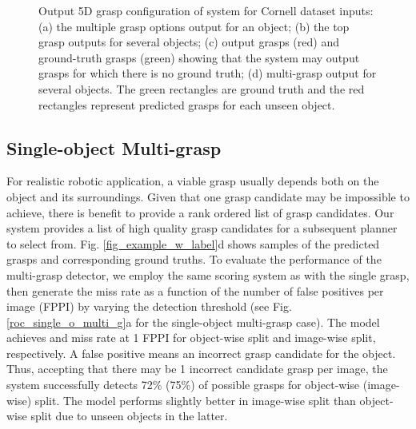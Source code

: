 \documentclass[letterpaper, 10 pt, journal, twoside]{IEEEtran}
\begin{document}
\begin{figure*}[t]
  \centering
  \vspace*{0.07in}
  \caption{Output 5D grasp configuration of system for Cornell dataset inputs: 
    (a) the multiple grasp options output for an object; 
    (b) the top grasp outputs for several objects; 
    (c) output grasps (red) and ground-truth grasps
    (green) showing that the system may output grasps for which
    there is no ground truth;
(d) multi-grasp output for several objects. The green rectangles are
    ground truth and the red rectangles represent predicted grasps for 
    each unseen object.
\label{fig_newArea} \label{fig_example_w_label} \label{singleGrasp}}
  \vspace*{-0.125in}
\end{figure*}

\subsection{Single-object Multi-grasp}
For realistic robotic application, a viable grasp usually depends both
on the object and its surroundings.  Given that one grasp candidate may
be impossible to achieve, there is benefit to provide a rank ordered
list of grasp candidates.  Our system provides a list of high quality
grasp candidates for a subsequent planner to select from. 
Fig. \ref{fig_example_w_label}d shows samples of the predicted grasps and
corresponding ground truths.  To evaluate the performance of the
multi-grasp detector, we employ the same scoring system as with the
single grasp, then generate the miss rate as a function of the number of false
positives per image (FPPI) by varying the detection threshold (see 
Fig. \ref{roc_single_o_multi_g}a for the single-object multi-grasp case).
The model achieves  and  miss rate at 1 FPPI for object-wise
split and image-wise split, respectively. 
A false positive means an incorrect grasp candidate for the object.
Thus, accepting that there may be 1 incorrect candidate grasp per image,
the system successfully detects 72\% (75\%) of possible grasps for
object-wise (image-wise) split.  The model performs slightly better in
image-wise split than object-wise split due to unseen objects in the
latter. 
\end{document}
